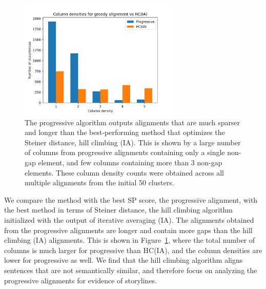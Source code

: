\documentclass{article}
\begin{document}
\begin{figure}[h]
\centering
\includegraphics[width=3in]{img/prog125vhcia}
\caption{
\label{fig:colcounts}
The progressive algorithm outputs alignments that are much sparser
and longer than the best-performing method that optimizes the Steiner distance,
hill climbing (IA).
This is shown by a large number of columns from progressive alignments
containing only a single non-gap element,
and few columns containing more than 3 non-gap elements.
These column density counts were obtained across all multiple alignments from the
initial 50 clusters.
}
\end{figure}

We compare the method with the best SP score, the progressive alignment,
with the best method in terms of Steiner distance, the hill climbing algorithm
initialized with the output of iterative averaging (IA).
The alignments obtained from the progressive alignments are longer and contain more gaps
than the hill climbing (IA) alignments.
This is shown in Figure~\ref{fig:colcounts},
where the total number of columns is much larger for progressive than HC(IA),
and the column densities are lower for progressive as well.
We find that the hill climbing algorithm aligns sentences
that are not semantically similar,
and therefore focus on analyzing the progressive alignments for evidence of
storylines.

\end{document}
